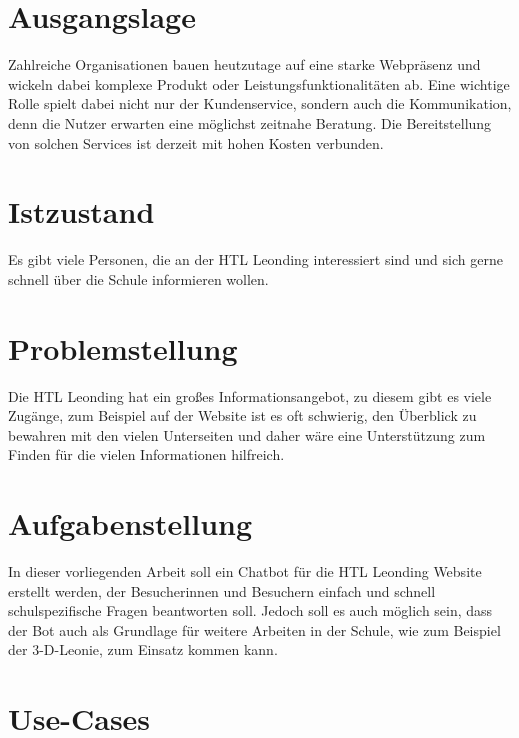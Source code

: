 \section{Ausgangslage}
Zahlreiche Organisationen bauen heutzutage auf eine starke Webpräsenz und wickeln dabei komplexe Produkt\- oder Leistungsfunktionalitäten ab.
Eine wichtige Rolle spielt dabei nicht nur der Kundenservice, sondern auch die Kommunikation, denn die Nutzer erwarten eine möglichst zeitnahe Beratung.
Die Bereitstellung von solchen Services ist derzeit mit hohen Kosten verbunden.

\section{Istzustand}
Es gibt viele Personen, die an der HTL Leonding interessiert sind und sich gerne schnell über die Schule informieren wollen.


\section{Problemstellung}
Die HTL Leonding hat ein großes Informationsangebot, zu diesem gibt es viele Zugänge, zum Beispiel auf der Website ist es oft schwierig, den Überblick zu bewahren mit den vielen Unterseiten und daher wäre eine Unterstützung zum Finden für die vielen Informationen hilfreich.

\section{Aufgabenstellung}
In dieser vorliegenden Arbeit soll ein Chatbot für die HTL Leonding Website erstellt werden, der Besucherinnen und Besuchern einfach und schnell schulspezifische Fragen beantworten soll.
Jedoch soll es auch möglich sein, dass der Bot auch als Grundlage für weitere Arbeiten in der Schule, wie zum Beispiel der 3-D-Leonie, zum Einsatz kommen kann.

\section{Use-Cases}

